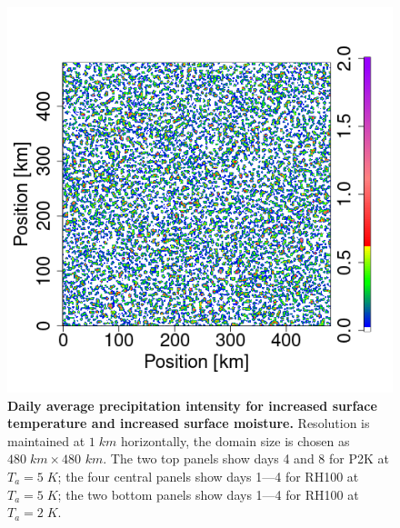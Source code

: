 \documentclass[draft,linenumbers]{agujournal2019}
\begin{document}
\begin{figure}[ht]
\includegraphics[trim={2cm 2.4cm 1cm 1cm}, clip, height=0.11\linewidth]{var1_daymean_T0_300K_ampl_4_1km_RH100_1153-1296.png}
\caption{{\bf Daily average precipitation intensity for increased surface temperature and increased surface moisture.} 
Resolution is maintained at $1\;km$ horizontally, the domain size is chosen as $480\;km\times 480$ $km$. The two top panels show days 4 and 8 for P2K at $T_a=5\;K$; 
the four central panels show days 1---4 for RH100 at $T_a=5\;K$;
the two bottom panels show days 1---4 for RH100 at $T_a=2\;K$.}
\label{fig:daily_mean_increased_T_q}
\end{figure}
\end{document}
